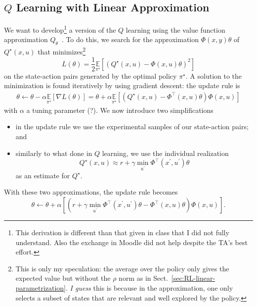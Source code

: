 \subsection{$Q$ Learning with Linear Approximation}

We want to develop\footnote{This derivation is different than that given in class that I did not fully understand. Also the exchange in Moodle did not help despite the TA's best effort.} a version of the $Q$ learning using the value function approximation $Q_\theta$~\cite[Sect.~17.6]{decision-making-kochenderfer}. To do this, we search for the approximation $\Phi(x,y)\theta$ of $Q^\star(x,u)$ that minimizes\footnote{This is only my speculation: the average over the policy only gives the expected value but without the $\rho$ norm as in Sect.~\ref{sec:RL-linear-parametrization}. \emph{I guess} this is because in the approximation, one only selects a subset of states that are relevant and well explored by the policy.}
\begin{equation*}
  L(\theta) = \frac{1}{2} \underset{\pi^\star}{\mathbb{E}}\left[\left(Q^\star(x,u) - \Phi(x,u)\theta\right)^2\right]
\end{equation*}
on the state-action pairs generated by the optimal policy $\pi^\star$. A solution to the minimization is found iteratively by using gradient descent: the update rule is
\begin{align*}
  \theta \leftarrow \theta - \alpha \underset{\pi^\star}{\mathbb{E}} \left[\nabla L(\theta)\right] = \theta + \alpha \underset{\pi^\star}{\mathbb{E}}\left[\left(Q^\star(x,u) - \Phi^\top(x,u)\theta\right)\Phi(x,u)\right]
\end{align*}
with $\alpha$ a tuning parameter (?). We now introduce two simplifications
\begin{itemize}
\item in the update rule we use the experimental samples of our state-action pairs; and
\item similarly to what done in $Q$ learning, we use the individual realization
  \begin{equation*}
    Q^\star(x,u) \approx r + \gamma \min_{u^\prime} \Phi^\top(x^\prime,u^\prime)\theta
  \end{equation*}
  as an estimate for $Q^\star$.
\end{itemize}
With these two approximations, the update rule becomes
\begin{equation*}
  \theta \leftarrow\theta + \alpha \left[\left(r + \gamma \min_{u^\prime} \Phi^\top(x^\prime,u^\prime)\theta - \Phi^\top(x,u)\theta\right)\Phi(x,u)\right].
\end{equation*}



